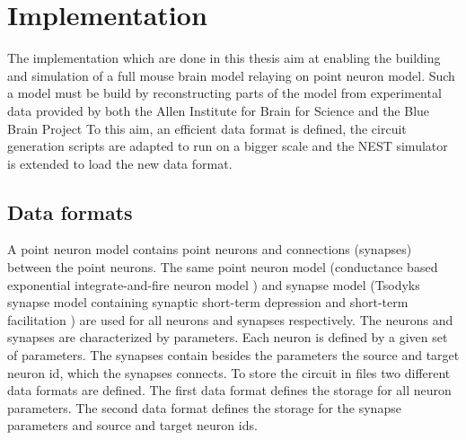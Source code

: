 %

\chapter{Implementation}

The implementation which are done in this thesis aim at enabling the building and simulation
of a full mouse brain model relaying on point neuron model. Such a model must be build by
reconstructing parts of the model from experimental data provided by both the Allen Institute for
Brain for Science and the Blue Brain Project
To this aim, an efficient data format is defined, the circuit generation scripts are adapted to
run on a bigger scale and the NEST simulator is extended to load the new data format.

\section{Data formats}
A point neuron model contains point neurons and connections (synapses) between the point neurons.
The same point neuron model (conductance based exponential integrate-and-fire neuron model \cite{brette2005adaptive}) and synapse model (Tsodyks synapse model containing synaptic short-term depression and short-term facilitation \cite{tsodyks1997neural, fuhrmann2002coding}) are used for all neurons and synapses respectively.
The neurons and synapses are characterized by parameters.
Each neuron is defined by a given set of parameters.
The synapses contain besides the parameters the source and target neuron id, which the synapses connects.
To store the circuit in files two different data formats are defined.
The first data format defines the storage for all neuron parameters.
The second data format defines the storage for the synapse parameters and source and target neuron ids.

